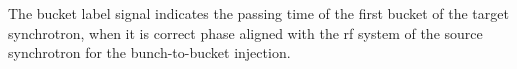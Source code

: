 %
%

 

The bucket label signal indicates the passing time of the first bucket of the target synchrotron, when it is correct phase aligned with the rf system of the source synchrotron for the bunch-to-bucket injection.


